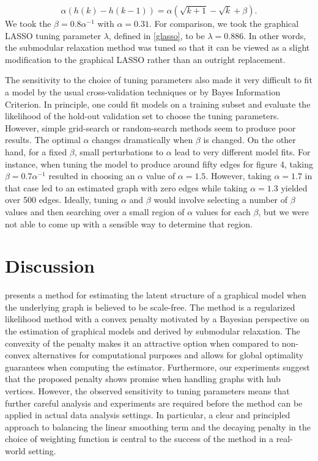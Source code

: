 \documentclass{uwstat572}
\theoremstyle{remark}
\theoremstyle{definition}
\begin{document}
\begin{equation*}
    \alpha \left( h(k) - h(k-1) \right) = \alpha \left( \sqrt{k+1} - \sqrt{k} + \beta \right).
\end{equation*}
We took the $\beta = 0.8 \alpha^{-1}$ with $\alpha = 0.31$.  For comparison, we took the graphical LASSO tuning parameter $\lambda$, defined in \eqref{glasso}, to be $\lambda = 0.886$.  In other words, the submodular relaxation method was tuned so that it can be viewed as a slight modification to the graphical LASSO rather than an outright replacement.  

The sensitivity to the choice of tuning parameters also made it very difficult to fit a model by the usual cross-validation techniques or by Bayes Information Criterion.  In principle, one could fit models on a training subset and evaluate the likelihood of the hold-out validation set to choose the tuning parameters.  However, simple grid-search or random-search methods seem to produce poor results.  The optimal $\alpha$ changes dramatically when $\beta$ is changed.  On the other hand, for a fixed $\beta$, small perturbations to $\alpha$ lead to very different model fits. For instance, when tuning the model to produce around fifty edges for figure 4, taking $\beta = 0.7 \alpha^{-1}$ resulted in choosing an $\alpha$ value of $\alpha = 1.5$.  However, taking $\alpha = 1.7$ in that case led to an estimated graph with zero edges while taking $\alpha = 1.3$ yielded over 500 edges.  Ideally, tuning $\alpha$ and $\beta$ would involve selecting a number of $\beta$ values and then searching over a small region of $\alpha$ values for each $\beta$, but we were not able to come up with a sensible way to determine that region.


\section{Discussion}

\cite{Defazio2012} presents a method for estimating the latent structure of a graphical model when the underlying graph is believed to be scale-free.  The method is a regularized likelihood method with a convex penalty motivated by a Bayesian perspective on the estimation of graphical models and derived by submodular relaxation.  The convexity of the penalty makes it an attractive option when compared to non-convex alternatives for computational purposes and allows for global optimality guarantees when computing the estimator. Furthermore, our experiments suggest that the proposed penalty shows promise when handling graphs with hub vertices.  However, the observed sensitivity to tuning parameters means that further careful analysis and experiments are required before the method can be applied in actual data analysis settings.  In particular, a clear and principled approach to balancing the linear smoothing term and the decaying penalty in the choice of weighting function is central to the success of the method in a real-world setting.



\end{document}
